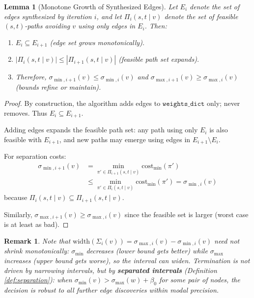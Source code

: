 \documentclass[twocolumn,11pt,a4paper]{article}
\newtheorem{lemma}[theorem]{Lemma}
\newtheorem{remark}[theorem]{Remark}
\theoremstyle{definition}
\begin{document}
\begin{lemma}[Monotone Growth of Synthesized Edges]
\label{lem:monotone_knowledge}
Let $E_i$ denote the set of edges synthesized by iteration $i$, and let $\Pi_i(s, t \mid v)$ denote the set of feasible $(s,t)$-paths avoiding $v$ using only edges in $E_i$. Then:
\begin{enumerate}
\item $E_i \subseteq E_{i+1}$ (edge set grows monotonically).
\item $|\Pi_i(s, t \mid v)| \leq |\Pi_{i+1}(s, t \mid v)|$ (feasible path set expands).
\item Therefore, $\sigma_{\min,i+1}(v) \leq \sigma_{\min,i}(v)$ and $\sigma_{\max,i+1}(v) \geq \sigma_{\max,i}(v)$ (bounds refine or maintain).
\end{enumerate}
\end{lemma}

\begin{proof}
By construction, the algorithm adds edges to $\texttt{weights\_dict}$ only; never removes. Thus $E_i \subseteq E_{i+1}$.

Adding edges expands the feasible path set: any path using only $E_i$ is also feasible with $E_{i+1}$, and new paths may emerge using edges in $E_{i+1} \setminus E_i$.

For separation costs:
\begin{align}
\sigma_{\min,i+1}(v) &= \min_{\pi' \in \Pi_{i+1}(s,t \mid v)} \text{cost}_{\min}(\pi') \\
&\leq \min_{\pi' \in \Pi_i(s,t \mid v)} \text{cost}_{\min}(\pi') = \sigma_{\min,i}(v)
\end{align}
because $\Pi_i(s,t \mid v) \subseteq \Pi_{i+1}(s,t \mid v)$.

Similarly, $\sigma_{\max,i+1}(v) \geq \sigma_{\max,i}(v)$ since the feasible set is larger (worst case is at least as bad).
\end{proof}

\begin{remark}
Note that $\text{width}(\Sigma_i(v)) = \sigma_{\max,i}(v) - \sigma_{\min,i}(v)$ need not shrink monotonically: $\sigma_{\min}$ decreases (lower bound gets better) while $\sigma_{\max}$ increases (upper bound gets worse), so the interval can widen. Termination is not driven by narrowing intervals, but by \textbf{separated intervals} (Definition \ref{def:separation}): when $\sigma_{\min}(v) > \sigma_{\max}(w) + \beta_0$ for some pair of nodes, the decision is robust to all further edge discoveries within modal precision.
\end{remark}
\end{document}
